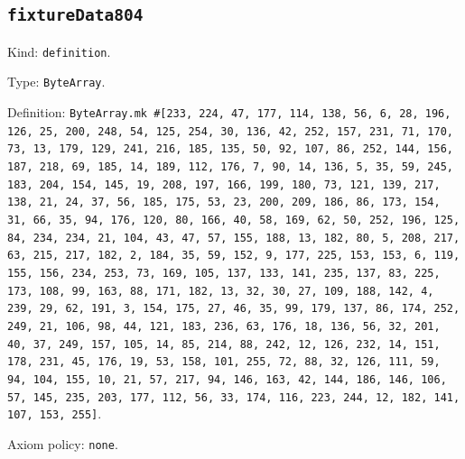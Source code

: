 \documentclass[11pt]{article}
\begin{document}
\subsection*{\texttt{fixtureData804}}
\noindent Kind: \texttt{definition}.\par
\noindent Type: \texttt{ByteArray}.\par
\noindent Definition: \texttt{ByteArray.mk \#[233, 224, 47, 177, 114, 138, 56, 6, 28, 196, 126, 25, 200, 248, 54, 125, 254, 30, 136, 42, 252, 157, 231, 71, 170, 73, 13, 179, 129, 241, 216, 185, 135, 50, 92, 107, 86, 252, 144, 156, 187, 218, 69, 185, 14, 189, 112, 176, 7, 90, 14, 136, 5, 35, 59, 245, 183, 204, 154, 145, 19, 208, 197, 166, 199, 180, 73, 121, 139, 217, 138, 21, 24, 37, 56, 185, 175, 53, 23, 200, 209, 186, 86, 173, 154, 31, 66, 35, 94, 176, 120, 80, 166, 40, 58, 169, 62, 50, 252, 196, 125, 84, 234, 234, 21, 104, 43, 47, 57, 155, 188, 13, 182, 80, 5, 208, 217, 63, 215, 217, 182, 2, 184, 35, 59, 152, 9, 177, 225, 153, 153, 6, 119, 155, 156, 234, 253, 73, 169, 105, 137, 133, 141, 235, 137, 83, 225, 173, 108, 99, 163, 88, 171, 182, 13, 32, 30, 27, 109, 188, 142, 4, 239, 29, 62, 191, 3, 154, 175, 27, 46, 35, 99, 179, 137, 86, 174, 252, 249, 21, 106, 98, 44, 121, 183, 236, 63, 176, 18, 136, 56, 32, 201, 40, 37, 249, 157, 105, 14, 85, 214, 88, 242, 12, 126, 232, 14, 151, 178, 231, 45, 176, 19, 53, 158, 101, 255, 72, 88, 32, 126, 111, 59, 94, 104, 155, 10, 21, 57, 217, 94, 146, 163, 42, 144, 186, 146, 106, 57, 145, 235, 203, 177, 112, 56, 33, 174, 116, 223, 244, 12, 182, 141, 107, 153, 255]}.\par
\noindent Axiom policy: \texttt{none}.\par
\end{document}
